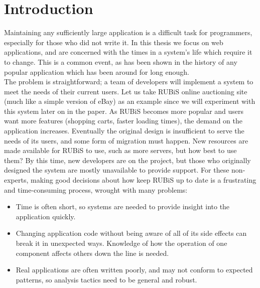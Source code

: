 \documentclass[msc,oneside]{ubcthesis}
\begin{document}
\chapter{Introduction} %


Maintaining any sufficiently large application is a difficult task for programmers, especially for those who did not write it. In this thesis we focus on web applications, and are concerned with the times in a system's life which require it to change. This is a common event, as has been shown in the history of any popular application which has been around for long enough.\\

The problem is straightforward; a team of developers will implement a system to meet the needs of their current users. Let us take RUBiS online auctioning site (much like a simple version of eBay) as an example since we will experiment with this system later on in the paper. As RUBiS becomes more popular and users want more features (shopping carts, faster loading times), the demand on the application increases. Eventually the original design is insufficient to serve the needs of its users, and some form of migration must happen. New resources are made available for RUBiS to use, such as more servers, but how best to use them? By this time, new developers are on the project, but those who originally designed the system are mostly unavailable to provide support. For these non-experts, making good decisions about how keep RUBiS up to date is a frustrating and time-consuming process, wrought with many problems:\\

\begin{itemize}
\item Time is often short, so systems are needed to provide insight into the application quickly.
\item Changing application code without being aware of all of its side effects can break it in unexpected ways. Knowledge of how the operation of one component affects others down the line is needed.
\item Real applications are often written poorly, and may not conform to expected patterns, so analysis tactics need to be general and robust.
\end{itemize}
\end{document}

